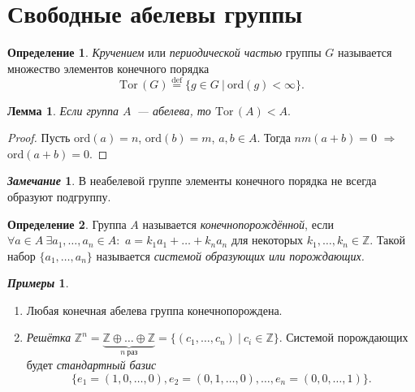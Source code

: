 \documentclass[a4paper, 14pt]{extarticle}
\newcommand{\deq}{\stackrel{\mathrm{def}}{=}}
\newcommand{\integers}{\mathbb{Z}}
\newcommand{\ord}{\mathrm{ord}}
\newcommand{\Tor}{\mathrm{Tor} \,}
\theoremstyle{definition}
\newtheorem*{exmpls}{\textit{Примеры}}
\newtheorem*{remark}{\textit{Замечание}}
\newtheorem{definition}{Определение}
\theoremstyle{plain}
\numberwithin{theorem}{section}
\numberwithin{definition}{section}
\numberwithin{statement}{section}
\newtheorem{lemma}{Лемма}
\numberwithin{lemma}{section}
\numberwithin{consequence}{section}
\begin{document}
        \section{Свободные абелевы группы}
        \setcounter{definition}{0}
        \begin{definition}
            \textit{Кручением} или \textit{периодической частью} группы $G$ называется множество элементов конечного порядка
            \begin{equation*}
                \Tor (G) \deq \{g \in G \ | \ \ord(g) < \infty\}.
            \end{equation*}
        \end{definition}
        \begin{lemma}
            Если группа $A$~--- абелева, то ${\Tor(A) < A.}$
        \end{lemma}
        \begin{proof}
            Пусть ${\ord(a) = n}$, ${\ord(b) = m}$, ${a,b \in A.}$ Тогда ${nm(a+b) = 0}$ $\Longrightarrow$ ${\ord(a+b) = 0.}$ \qedhere
        \end{proof}
        \begin{remark}
            В неабелевой группе элементы конечного порядка не всегда образуют подгруппу.
        \end{remark}
        \begin{definition}
            Группа $A$ называется \textit{конечнопорождённой}, если ${\forall a \in A \ \exists a_1,\ldots,a_n \in A{:}}$ ${a = k_1a_1+\ldots+k_na_n}$ для некоторых ${k_1,\ldots,k_n \in \integers.}$ Такой набор ${\{a_1,\ldots,a_n\}}$ называется \textit{системой образующих или порождающих.}
        \end{definition}
        \begin{exmpls}
            \
            \begin{enumerate}
            \setlength\itemsep{0.1em}
                \item Любая конечная абелева группа конечнопорождена.
                \item \textit{Решётка} ${\integers^n = \underbrace{\integers \oplus \ldots \oplus \integers}_{n \ \textrm{раз}} = \{(c_1,\ldots,c_n) \ | \ c_i \in \integers\}.}$ Системой порождающих будет \textit{стандартный базис}
                \begin{equation*}
                    \{e_1 = (1,0,\ldots,0), e_2 = (0,1,\ldots,0), \ldots, e_n = (0,0,\ldots,1)\}.
                \end{equation*}
            \end{enumerate}
        \end{exmpls}
\end{document}
